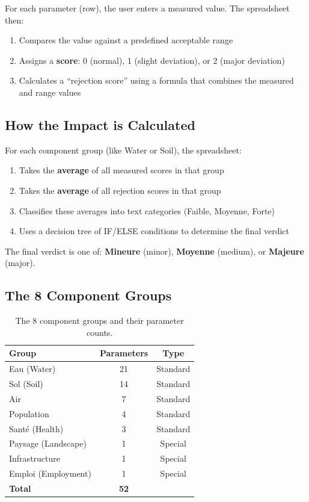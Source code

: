 \documentclass[12pt,a4paper]{article}
\begin{document}
For each parameter (row), the user enters a measured value. The spreadsheet then:

\begin{enumerate}
    \item Compares the value against a predefined acceptable range
    \item Assigns a \textbf{score}: 0 (normal), 1 (slight deviation), or 2 (major deviation)
    \item Calculates a ``rejection score'' using a formula that combines the measured and range values
\end{enumerate}

\subsection{How the Impact is Calculated}

For each component group (like Water or Soil), the spreadsheet:

\begin{enumerate}
    \item Takes the \textbf{average} of all measured scores in that group
    \item Takes the \textbf{average} of all rejection scores in that group
    \item Classifies these averages into text categories (Faible, Moyenne, Forte)
    \item Uses a decision tree of IF/ELSE conditions to determine the final verdict
\end{enumerate}

The final verdict is one of: \textbf{Mineure} (minor), \textbf{Moyenne} (medium), or \textbf{Majeure} (major).

\subsection{The 8 Component Groups}

\begin{table}[H]
\centering
\begin{tabular}{lcc}
\toprule
\textbf{Group} & \textbf{Parameters} & \textbf{Type} \\
\midrule
Eau (Water) & 21 & Standard \\
Sol (Soil) & 14 & Standard \\
Air & 7 & Standard \\
Population & 4 & Standard \\
Sant\'e (Health) & 3 & Standard \\
Paysage (Landscape) & 1 & Special \\
Infrastructure & 1 & Special \\
Emploi (Employment) & 1 & Special \\
\midrule
\textbf{Total} & \textbf{52} & \\
\bottomrule
\end{tabular}
\caption{The 8 component groups and their parameter counts.}
\end{table}
\end{document}
